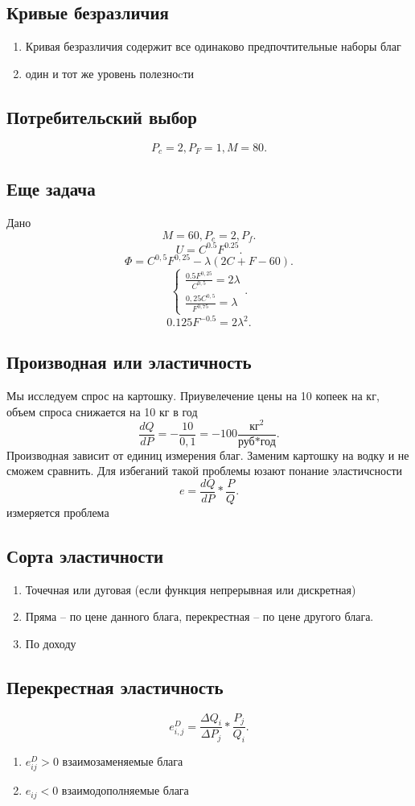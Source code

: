 \documentclass[14pt]{extarticle}
\begin{document}
\subsection{Кривые безразличия}
\begin{enumerate}
	\item Кривая безразличия содержит все одинаково предпочтительные наборы благ
	\item один и тот же уровень полезноcти
\end{enumerate}
\subsection{Потребительский выбор}
\[
	P_{c} = 2, P_{F} = 1, M = 80
	.\]
\subsection{Еще задача}
Дано
\[
	M = 60 , P_{c} = 2, P_{f}
	.\]
\[
	U = C^{0.5}F^{0.25}
	.\]
\[
	\Phi = C^{0,5} F^{0,25} - \lambda(2C +F - 60)
	.\]
\[
	\begin{cases}
		\frac{0.5 F ^{0,25}}{C^{0,5}} = 2\lambda \\
		\frac{0,25 C^{0,5}}{F^{0,75}}= \lambda
	\end{cases}
	.\]
\[
	0.125 F^{-0.5} = 2 \lambda^2
	.\]
\subsection{Производная или эластичность}
Мы исследуем спрос на картошку. Приувелечение цены на 10 копеек на кг, объем спроса снижается на 10 кг в год
\[
	\frac{dQ}{dP} = - \frac{10}{0,1} = -100 \frac{\text{кг}^2}{\text{руб}*\text{год}}
	.\]
Производная зависит от единиц измерения благ. Заменим картошку на водку и не сможем сравнить.
Для избеганий такой проблемы юзают понание эластичсности
\[
	e  = \frac{d Q}{d P} * \frac{P}{Q}
	.\]
измеряется проблема
\subsection{Сорта эластичности}
\begin{enumerate}
	\item Точечная или дуговая (если функция непрерывная или дискретная)
	\item Пряма -- по цене данного блага, перекрестная -- по цене другого блага.
	\item По доходу
\end{enumerate}
\subsection{Перекрестная эластичность}
\[
	e_{i,j}^{D} = \frac{\varDelta Q_{i}}{\varDelta P_{j}} * \frac{P_{j}}{Q_{i}}
	.\]
\begin{enumerate}
	\item $e_{ij}^{D} > 0$  взаимозаменяемые блага
	\item $e_{ij} < 0$ взаимодополняемые блага
\end{enumerate}
\end{document}
